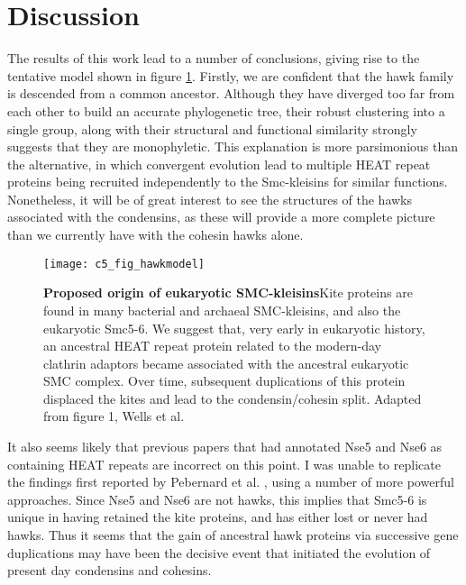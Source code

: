\documentclass[a4paper,11pt,twoside,openright]{scrbook}
\begin{document}
\clearpage

\section{Discussion}
The results of this work lead to a number of conclusions, giving rise to the
tentative model shown in figure \ref{figure:hawkmodel}. Firstly, we are
confident that the hawk family is descended from a common ancestor. Although
they have diverged too far from each other to build an accurate phylogenetic
tree, their robust clustering into a single group, along with their structural
and functional similarity strongly suggests that they are monophyletic. This
explanation is more parsimonious than the alternative, in which convergent
evolution lead to multiple HEAT repeat proteins being recruited independently to
the Smc-kleisins for similar functions. Nonetheless, it will be of great
interest to see the structures of the hawks associated with the condensins, as
these will provide a more complete picture than we currently have with the
cohesin hawks alone.

\begin{figure}[h]
\fcapsideright
    {\caption[Proposed origin of eukaryotic
    SMC-kleisins]{\sffamily\textbf{Proposed origin of eukaryotic
    SMC-kleisins}\newline \small Kite proteins are found in many bacterial and
    archaeal SMC-kleisins, and also the eukaryotic Smc5-6. We suggest that, very
    early in eukaryotic history, an ancestral HEAT repeat protein related to the
    modern-day clathrin adaptors became associated with the ancestral eukaryotic
    SMC complex. Over time, subsequent duplications of this protein displaced
    the kites and lead to the condensin/cohesin split. Adapted from figure 1,
    Wells et al. \cite{Wells2017}}\label{figure:hawkmodel}}
    {\texttt{[image: c5\_fig\_hawkmodel]}}
\end{figure}

It also seems  likely that previous papers that had annotated Nse5 and Nse6 as
containing HEAT repeats are incorrect on this point. I was unable to replicate
the findings first reported by Pebernard et al. \cite{Pebernard2006}, using a
number of more powerful approaches. Since Nse5 and Nse6 are not hawks, this
implies that Smc5-6 is unique in having retained the kite proteins, and has
either lost or never had hawks. Thus it seems that the gain of ancestral hawk
proteins via successive gene duplications may have been the decisive event that
initiated the evolution of present day condensins and cohesins.
\end{document}
